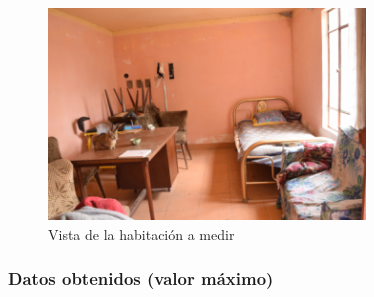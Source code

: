 \documentclass[letter,11pt]{article}
\begin{document}
\begin{figure}
\centering
\includegraphics[width=0.75\textwidth]{resources/1.2.sonometro.eps}
\caption{Vista de la habitación a medir}
\label{sonometro}
\end{figure}

\subsubsection{Datos obtenidos (valor máximo)}
\end{document}
